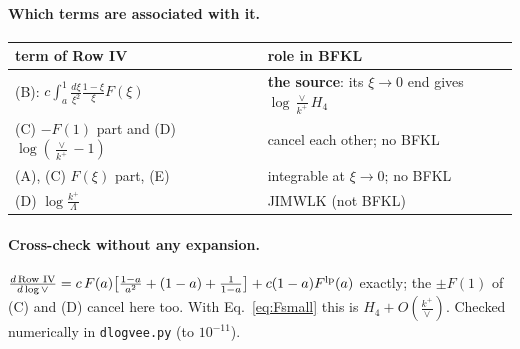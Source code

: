 \documentclass[10pt]{article}
\numberwithin{equation}{section}
\begin{document}
\paragraph{Which terms are associated with it.}
\begin{center}\small
\begin{tabular}{@{}p{}p{}@{}}\toprule
term of Row IV & role in BFKL\\\midrule
(B): $c\int_a^1\frac{d\xi}{\xi^2}\frac{1-\xi}{\xi}F(\xi)$ & \textbf{the source}: its $\xi\to0$ end gives $\log\frac{\vee}{k^+}H_4$\\
(C) $-F(1)$ part and (D) $\log(\frac{\vee}{k^+}-1)$ & cancel each other; no BFKL\\
(A), (C) $F(\xi)$ part, (E) & integrable at $\xi\to0$; no BFKL\\
(D) $\log\frac{k^+}{\Lambda}$ & JIMWLK (not BFKL)\\\bottomrule
\end{tabular}
\end{center}

\paragraph{Cross-check without any expansion.} $\frac{d\,\text{Row IV}}{d\log\vee}=c\,F(a)\big[\frac{1-a}{a^2}+(1-a)+\frac{1}{1-a}\big]+c(1-a)F^{\rm lp}(a)$ exactly; the $\pm F(1)$ of (C) and (D) cancel here too. With Eq.~\eqref{eq:Fsmall} this is $H_4+O(\frac{k^+}{\vee})$. Checked numerically in \texttt{dlogvee.py} (to $10^{-11}$).
\end{document}
